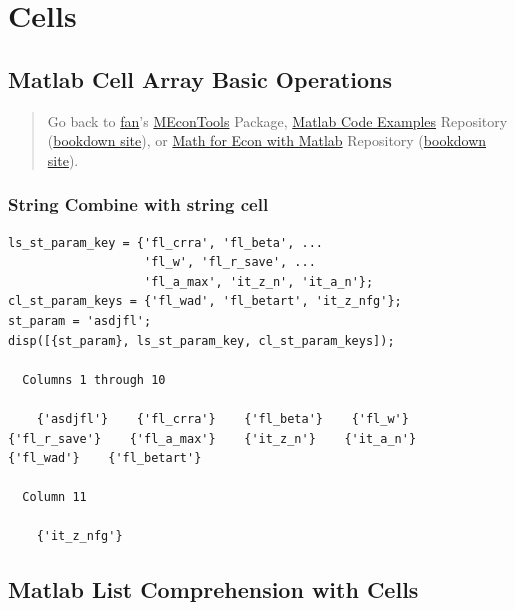\documentclass[
]{book}
\begin{document}
\hypertarget{cells}{%
\section{Cells}\label{cells}}

\hypertarget{matlab-cell-array-basic-operations}{%
\subsection{Matlab Cell Array Basic Operations}\label{matlab-cell-array-basic-operations}}

\begin{quote}
Go back to \href{http://fanwangecon.github.io/}{fan}'s \href{https://fanwangecon.github.io/MEconTools/}{MEconTools} Package, \href{https://fanwangecon.github.io/M4Econ/}{Matlab Code Examples} Repository (\href{https://fanwangecon.github.io/M4Econ/bookdown}{bookdown site}), or \href{https://fanwangecon.github.io/Math4Econ/}{Math for Econ with Matlab} Repository (\href{https://fanwangecon.github.io/Math4Econ/bookdown}{bookdown site}).
\end{quote}

\hypertarget{string-combine-with-string-cell}{%
\subsubsection{String Combine with string cell}\label{string-combine-with-string-cell}}

\begin{verbatim}
ls_st_param_key = {'fl_crra', 'fl_beta', ...
                   'fl_w', 'fl_r_save', ...
                   'fl_a_max', 'it_z_n', 'it_a_n'};
cl_st_param_keys = {'fl_wad', 'fl_betart', 'it_z_nfg'};
st_param = 'asdjfl';
disp([{st_param}, ls_st_param_key, cl_st_param_keys]);

  Columns 1 through 10

    {'asdjfl'}    {'fl_crra'}    {'fl_beta'}    {'fl_w'}    {'fl_r_save'}    {'fl_a_max'}    {'it_z_n'}    {'it_a_n'}    {'fl_wad'}    {'fl_betart'}

  Column 11

    {'it_z_nfg'}
\end{verbatim}

\hypertarget{matlab-list-comprehension-with-cells}{%
\subsection{Matlab List Comprehension with Cells}\label{matlab-list-comprehension-with-cells}}
\end{document}
